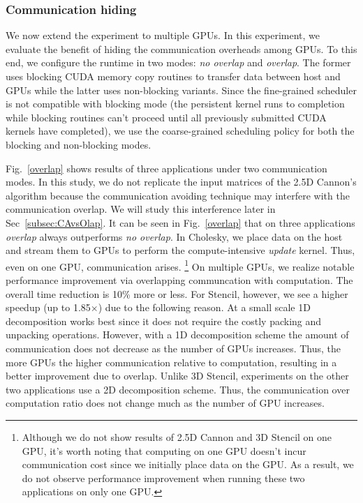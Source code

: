 \subsubsection{Communication hiding}
We now extend the experiment to multiple GPUs.
In this experiment, we evaluate the benefit of hiding the communication overheads among GPUs.
To this end, we configure the runtime in two modes: {\em no overlap} and {\em overlap}.
The former uses blocking CUDA memory copy routines to transfer data between host and GPUs while the latter uses non-blocking variants.
Since the fine-grained scheduler is not compatible with blocking mode (the persistent kernel runs to completion while blocking routines can't proceed until all previously submitted CUDA kernels have completed), we use the coarse-grained scheduling policy for both the blocking and non-blocking modes.

Fig.~\ref{overlap} shows results of three applications under two communication modes.
In this study, we do not replicate the input matrices of the 2.5D Cannon's algorithm because the communication avoiding technique may interfere with the communication overlap.
We will study this interference later in Sec~\ref{subsec:CAvsOlap}.
It can be seen in Fig.~\ref{overlap} that on three applications {\em overlap} always outperforms {\em no overlap}.
In Cholesky, we place data on the host and stream them to GPUs to perform the compute-intensive {\em update} kernel.
Thus, even on one GPU, communication arises.
\footnote{Although we do not show results of 2.5D Cannon and 3D Stencil on one GPU, it's worth noting that computing on one GPU doesn't incur communication cost since we initially place data on the GPU.
As a result, we do not observe performance improvement when running these two applications on only one GPU.}
On multiple GPUs, we realize notable performance improvement via overlapping communcation with computation.
The overall time reduction is 10\% more or less.
For Stencil, however, we see a higher speedup (up to 1.85$\times$) due to the following reason.
At a small scale 1D decomposition works best since it does not require the costly packing and unpacking operations.
However, with a 1D decomposition scheme the amount of communication does not decrease as the number of GPUs increases.
Thus, the more GPUs the higher communication relative to computation, resulting in a better improvement due to overlap.
Unlike 3D Stencil, experiments on the other two applications use a 2D decomposition scheme.
Thus, the communication over computation ratio does not change much as the number of GPU increases.

